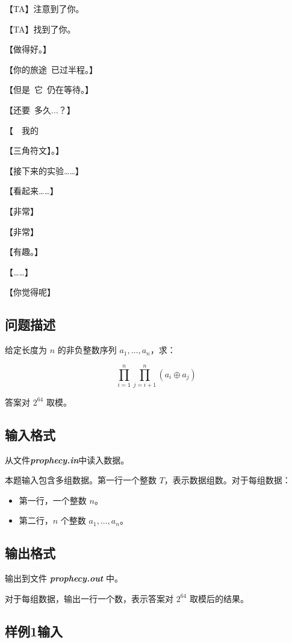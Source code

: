 \documentclass[12pt]{article}
\newcommand{\filename}[1]{{\textbf{\textit{#1}}}}
\begin{document}
【TA】注意到了你。

【TA】找到了你。

【做得好。】

【你的旅途\ 已过半程。】

【但是\ 它\ 仍在等待。】

【还要\ 多久...？】

【\ \ 我的

【三角符文】。】

【接下来的实验……】

【看起来……】

【非常】

【非常】

【有趣。】

【……】

【你觉得呢】

\subsection{问题描述}

给定长度为 $n$ 的非负整数序列 $a_1, \ldots, a_n$，求：

$$\prod_{i=1}^n\prod_{j=i+1}^n(a_i\oplus a_j)$$

答案对 $2^{64}$ 取模。

\subsection{输入格式}

从文件\filename{prophecy.in}中读入数据。

本题输入包含多组数据。第一行一个整数 $T$，表示数据组数。对于每组数据：

\begin{itemize}
    \item 第一行，一个整数 $n$。
    \item 第二行，$n$ 个整数 $a_1, \ldots, a_n$。
\end{itemize}

\subsection{输出格式}

输出到文件 \filename{prophecy.out} 中。

对于每组数据，输出一行一个数，表示答案对 $2^{64}$ 取模后的结果。

\subsection{样例1输入}
\end{document}
